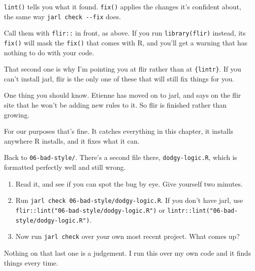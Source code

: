 \documentclass[
  letterpaper,
  justified,
  a4paper]{tufte-book}
\providecommand{\tightlist}{%
  \setlength{\itemsep}{0pt}\setlength{\parskip}{0pt}}
\providecommand{\tightlist}{%
  \setlength{\itemsep}{0pt}\setlength{\parskip}{0pt}}
\begin{document}
\texttt{lint()} tells you what it found. \texttt{fix()} applies the
changes it's confident about, the same way \texttt{jarl\ check\ -\/-fix}
does.

Call them with \texttt{flir::} in front, as above. If you run
\texttt{library(flir)} instead, its \texttt{fix()} will mask the
\texttt{fix()} that comes with R, and you'll get a warning that has
nothing to do with your code.

That second one is why I'm pointing you at flir rather than at
\texttt{\{lintr\}}. If you can't install jarl, flir is the only one of
these that will still fix things for you.

One thing you should know. Etienne has moved on to jarl, and says on the
flir site that he won't be adding new rules to it. So flir is finished
rather than growing.

For our purposes that's fine. It catches everything in this chapter, it
installs anywhere R installs, and it fixes what it can.

\begin{tcolorbox}[enhanced jigsaw, arc=.35mm, bottomrule=.15mm, bottomtitle=1mm, breakable, colback=white, colbacktitle=quarto-callout-note-color!10!white, colframe=quarto-callout-note-color-frame, coltitle=black, left=2mm, leftrule=.75mm, opacityback=0, opacitybacktitle=0.6, rightrule=.15mm, title=\textcolor{quarto-callout-note-color}{\faInfo}\hspace{0.5em}{Your Turn}, titlerule=0mm, toprule=.15mm, toptitle=1mm]

Back to \texttt{06-bad-style/}. There's a second file there,
\texttt{dodgy-logic.R}, which is formatted perfectly well and still
wrong.

\begin{enumerate}
\def\labelenumi{\arabic{enumi}.}
\tightlist
\item
  Read it, and see if you can spot the bug by eye. Give yourself two
  minutes.
\item
  Run \texttt{jarl\ check\ 06-bad-style/dodgy-logic.R}. If you don't
  have jarl, use \texttt{flir::lint("06-bad-style/dodgy-logic.R")} or
  \texttt{lintr::lint("06-bad-style/dodgy-logic.R")}.
\item
  Now run \texttt{jarl\ check} over your own most recent project. What
  comes up?
\end{enumerate}

Nothing on that last one is a judgement. I run this over my own code and
it finds things every time.

\end{tcolorbox}
\end{document}
